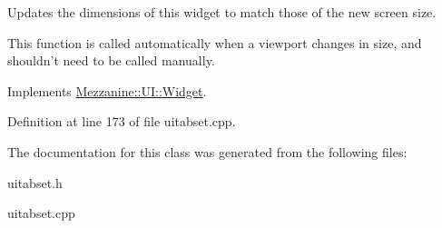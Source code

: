Updates the dimensions of this widget to match those of the new screen size. 

This function is called automatically when a viewport changes in size, and shouldn't need to be called manually. 

Implements \hyperlink{classMezzanine_1_1UI_1_1Widget_af23f919f2912ac10230953a848c9889c}{Mezzanine::UI::Widget}.



Definition at line 173 of file uitabset.cpp.



The documentation for this class was generated from the following files:\begin{DoxyCompactItemize}
\item 
uitabset.h\item 
uitabset.cpp\end{DoxyCompactItemize}
